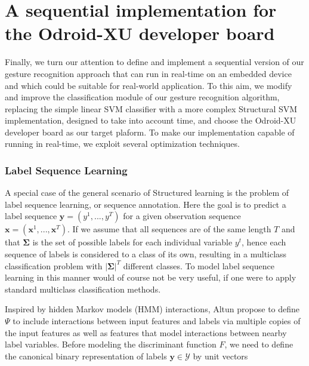 
\chapter{A sequential implementation for the Odroid-XU developer board}


Finally, we turn our attention to define and implement a sequential version of our gesture recognition approach that can run in real-time on an embedded device and which could be suitable for real-world application. To this aim, we modify and improve the classification module of our gesture recognition algorithm, replacing the simple linear SVM classifier with a more complex Structural SVM implementation, designed to take into account time, and choose the Odroid-XU developer board as our target plaform. To make our implementation capable of running in real-time, we exploit several optimization techniques.

\subsection{Label Sequence Learning}
\label{svmhmm}
A special case of the general scenario of Structured learning is the problem of label sequence learning, or sequence annotation. Here the goal is to predict a label sequence $\mathbf{y} = (y^1,...,y^T)$ for a given observation sequence $\mathbf{x} = (\mathbf{x}^1,...,\mathbf{x}^T)$. If we assume that all sequences are of the same length $T$ and that $\mathbf{\Sigma}$ is the set of possible labels for each individual variable $y^t$, hence each sequence of labels is considered to a class of its own, resulting in a multiclass classification problem with $|\mathbf{\Sigma}|^T$ different classes. To model label sequence learning in this manner would of course not be very useful, if one were to apply standard multiclass classification methods.

Inspired by hidden Markov models (HMM) interactions, Altun \etal \cite{altun2003hidden} propose to define $\Psi$ to include interactions between input features and labels via multiple copies of the input features as well as features that model interactions between nearby label variables. Before modeling the discriminant function $F$, we need to define the canonical binary representation of labels $\mathbf{y} \in \mathcal{Y}$ by unit vectors

